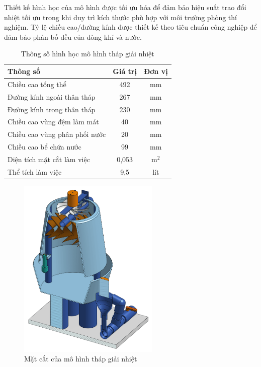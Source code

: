 \documentclass[../main.tex]{subfiles}
\begin{document}
Thiết kế hình học của mô hình được tối ưu hóa để đảm bảo hiệu suất trao đổi nhiệt tối ưu trong khi duy trì kích thước phù hợp với môi trường phòng thí nghiệm. Tỷ lệ chiều cao/đường kính được thiết kế theo tiêu chuẩn công nghiệp để đảm bảo phân bố đều của dòng khí và nước.

\begin{table}[H]
\centering
\renewcommand{\arraystretch}{1.1}
\caption{Thông số hình học mô hình tháp giải nhiệt}
\label{tab:geometric_specs}
\begin{tabular}{|l|c|c|}
\hline
\textbf{Thông số} & \textbf{Giá trị} & \textbf{Đơn vị} \\
\hline
Chiều cao tổng thể & 492 & mm \\
\hline
Đường kính ngoài thân tháp & 267 & mm \\
\hline
Đường kính trong thân tháp & 230 & mm \\
\hline
Chiều cao vùng đệm làm mát & 40 & mm \\
\hline
Chiều cao vùng phân phối nước & 20 & mm \\
\hline
Chiều cao bể chứa nước & 99 & mm \\
\hline
Diện tích mặt cắt làm việc & 0,053 & m$^2$ \\
\hline
Thể tích làm việc & 9,5 & lít \\
\hline
\end{tabular}
\end{table}

\begin{figure} [H]
    \centering
    \includegraphics[width=0.6\textwidth]{Hinhve/mat_cat.png}
    \caption{Mặt cắt của mô hình tháp giải nhiệt}
    \label{fig:mat_cat}
\end{figure}
\end{document}
